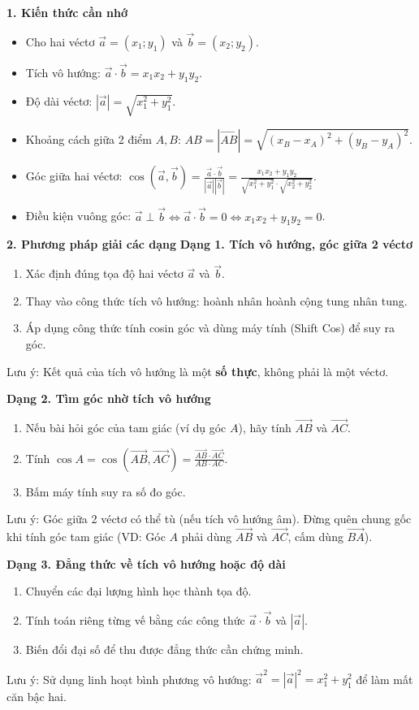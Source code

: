 \textbf{1. Kiến thức cần nhớ}
\begin{itemize}
\item Cho hai véctơ $\vec{a} = (x_1; y_1)$ và $\vec{b} = (x_2; y_2)$.
\item Tích vô hướng: $\boxed{\vec{a} \cdot \vec{b} = x_1 x_2 + y_1 y_2}$.
\item Độ dài véctơ: $|\vec{a}| = \sqrt{x_1^2 + y_1^2}$.
\item Khoảng cách giữa 2 điểm $A, B$: $AB = |\overrightarrow{AB}| = \sqrt{(x_B - x_A)^2 + (y_B - y_A)^2}$.
\item Góc giữa hai véctơ: $\cos(\vec{a}, \vec{b}) = \frac{\vec{a} \cdot \vec{b}}{|\vec{a}| |\vec{b}|} = \frac{x_1 x_2 + y_1 y_2}{\sqrt{x_1^2 + y_1^2} \cdot \sqrt{x_2^2 + y_2^2}}$.
\item Điều kiện vuông góc: $\vec{a} \perp \vec{b} \Leftrightarrow \vec{a} \cdot \vec{b} = 0 \Leftrightarrow \boxed{x_1 x_2 + y_1 y_2 = 0}$.
\end{itemize}

\textbf{2. Phương pháp giải các dạng}
\textbf{Dạng 1. Tích vô hướng, góc giữa 2 véctơ}
\begin{enumerate}
\item Xác định đúng tọa độ hai véctơ $\vec{a}$ và $\vec{b}$.
\item Thay vào công thức tích vô hướng: hoành nhân hoành cộng tung nhân tung.
\item Áp dụng công thức tính cosin góc và dùng máy tính (Shift Cos) để suy ra góc.
\end{enumerate}
Lưu ý: Kết quả của tích vô hướng là một \textbf{số thực}, không phải là một véctơ.

\textbf{Dạng 2. Tìm góc nhờ tích vô hướng}
\begin{enumerate}
\item Nếu bài hỏi góc của tam giác (ví dụ góc $A$), hãy tính $\overrightarrow{AB}$ và $\overrightarrow{AC}$.
\item Tính $\cos A = \cos(\overrightarrow{AB}, \overrightarrow{AC}) = \frac{\overrightarrow{AB} \cdot \overrightarrow{AC}}{AB \cdot AC}$.
\item Bấm máy tính suy ra số đo góc.
\end{enumerate}
Lưu ý: Góc giữa 2 véctơ có thể tù (nếu tích vô hướng âm). Đừng quên chung gốc khi tính góc tam giác (VD: Góc $A$ phải dùng $\overrightarrow{AB}$ và $\overrightarrow{AC}$, cấm dùng $\overrightarrow{BA}$).

\textbf{Dạng 3. Đẳng thức về tích vô hướng hoặc độ dài}
\begin{enumerate}
\item Chuyển các đại lượng hình học thành tọa độ.
\item Tính toán riêng từng vế bằng các công thức $\vec{a} \cdot \vec{b}$ và $|\vec{a}|$.
\item Biến đổi đại số để thu được đẳng thức cần chứng minh.
\end{enumerate}
Lưu ý: Sử dụng linh hoạt bình phương vô hướng: $\vec{a}^2 = |\vec{a}|^2 = x_1^2 + y_1^2$ để làm mất căn bậc hai.

